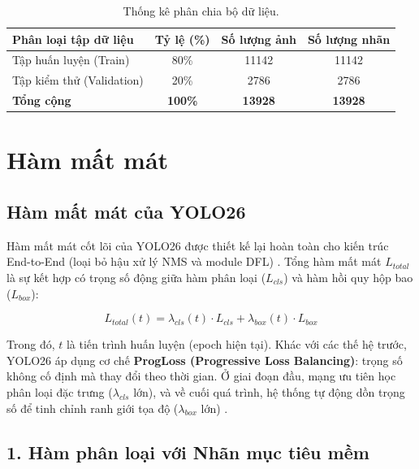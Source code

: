 \begin{table}[h]
    \centering
    \caption{Thống kê phân chia bộ dữ liệu.}
    \label{tab:wotr_dataset}
    \begin{tabular}{lccc}
        \toprule
        \textbf{Phân loại tập dữ liệu} & \textbf{Tỷ lệ (\%)} & \textbf{Số lượng ảnh} & \textbf{Số lượng nhãn} \\
        \midrule
        Tập huấn luyện (Train)       & 80\%               & 11142                   & 11142                    \\
        Tập kiểm thử (Validation)    & 20\%               & 2786                   & 2786                    \\
        \midrule
        \textbf{Tổng cộng}           & \textbf{100\%}     & \textbf{13928}          & \textbf{13928}           \\
        \bottomrule
    \end{tabular}
\end{table}

\section{Hàm mất mát}

\subsection{Hàm mất mát của YOLO26}

Hàm mất mát cốt lõi của YOLO26 được thiết kế lại hoàn toàn cho kiến trúc End-to-End (loại bỏ hậu xử lý NMS và module DFL) \cite{Reference3}. Tổng hàm mất mát $L_{total}$ là sự kết hợp có trọng số động giữa hàm phân loại ($L_{cls}$) và hàm hồi quy hộp bao ($L_{box}$):

\begin{equation}
L_{total}(t) = \lambda_{cls}(t) \cdot L_{cls} + \lambda_{box}(t) \cdot L_{box}
\end{equation}

Trong đó, $t$ là tiến trình huấn luyện (epoch hiện tại). Khác với các thế hệ trước, YOLO26 áp dụng cơ chế \textbf{ProgLoss (Progressive Loss Balancing)}: trọng số không cố định mà thay đổi theo thời gian. Ở giai đoạn đầu, mạng ưu tiên học phân loại đặc trưng ($\lambda_{cls}$ lớn), và về cuối quá trình, hệ thống tự động dồn trọng số để tinh chỉnh ranh giới tọa độ ($\lambda_{box}$ lớn) \cite{Reference3}.

\subsection*{1. Hàm phân loại với Nhãn mục tiêu mềm}

